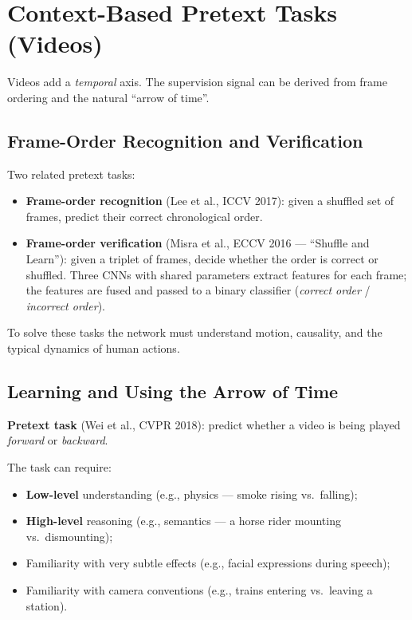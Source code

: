 \documentclass[11pt,a4paper]{article}
\theoremstyle{definition}
\theoremstyle{plain}
\theoremstyle{remark}
\begin{document}
\section{Context-Based Pretext Tasks (Videos)}

Videos add a \emph{temporal} axis. The supervision signal can be derived from frame ordering and the natural ``arrow of time''.

\subsection{Frame-Order Recognition and Verification}

Two related pretext tasks:

\begin{itemize}
    \item \textbf{Frame-order recognition} (Lee et al., ICCV 2017): given a shuffled set of frames, predict their correct chronological order.
    \item \textbf{Frame-order verification} (Misra et al., ECCV 2016 --- ``Shuffle and Learn''): given a triplet of frames, decide whether the order is correct or shuffled. Three CNNs with shared parameters extract features for each frame; the features are fused and passed to a binary classifier (\textit{correct order} / \textit{incorrect order}).
\end{itemize}

To solve these tasks the network must understand motion, causality, and the typical dynamics of human actions.

\subsection{Learning and Using the Arrow of Time}

\textbf{Pretext task} (Wei et al., CVPR 2018): predict whether a video is being played \emph{forward} or \emph{backward}.

The task can require:
\begin{itemize}
    \item \textbf{Low-level} understanding (e.g., physics --- smoke rising vs.\ falling);
    \item \textbf{High-level} reasoning (e.g., semantics --- a horse rider mounting vs.\ dismounting);
    \item Familiarity with very subtle effects (e.g., facial expressions during speech);
    \item Familiarity with camera conventions (e.g., trains entering vs.\ leaving a station).
\end{itemize}
\end{document}
